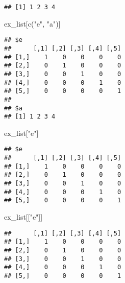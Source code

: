 \documentclass[
]{article}
\newenvironment{Shaded}{\begin{snugshade}}{\end{snugshade}}
\newcommand{\FunctionTok}[1]{\textcolor[rgb]{0.00,0.00,0.00}{#1}}
\newcommand{\NormalTok}[1]{#1}
\newcommand{\SpecialCharTok}[1]{\textcolor[rgb]{0.00,0.00,0.00}{#1}}
\newcommand{\StringTok}[1]{\textcolor[rgb]{0.31,0.60,0.02}{#1}}
\begin{document}
\begin{verbatim}
## [1] 1 2 3 4
\end{verbatim}

\begin{Shaded}
\begin{Highlighting}[]
\NormalTok{ex\_list[}\FunctionTok{c}\NormalTok{(}\StringTok{"e"}\NormalTok{, }\StringTok{"a"}\NormalTok{)]}
\end{Highlighting}
\end{Shaded}

\begin{verbatim}
## $e
##      [,1] [,2] [,3] [,4] [,5]
## [1,]    1    0    0    0    0
## [2,]    0    1    0    0    0
## [3,]    0    0    1    0    0
## [4,]    0    0    0    1    0
## [5,]    0    0    0    0    1
## 
## $a
## [1] 1 2 3 4
\end{verbatim}

\begin{Shaded}
\begin{Highlighting}[]
\NormalTok{ex\_list[}\StringTok{"e"}\NormalTok{]}
\end{Highlighting}
\end{Shaded}

\begin{verbatim}
## $e
##      [,1] [,2] [,3] [,4] [,5]
## [1,]    1    0    0    0    0
## [2,]    0    1    0    0    0
## [3,]    0    0    1    0    0
## [4,]    0    0    0    1    0
## [5,]    0    0    0    0    1
\end{verbatim}

\begin{Shaded}
\begin{Highlighting}[]
\NormalTok{ex\_list[[}\StringTok{"e"}\NormalTok{]]}
\end{Highlighting}
\end{Shaded}

\begin{verbatim}
##      [,1] [,2] [,3] [,4] [,5]
## [1,]    1    0    0    0    0
## [2,]    0    1    0    0    0
## [3,]    0    0    1    0    0
## [4,]    0    0    0    1    0
## [5,]    0    0    0    0    1
\end{verbatim}

\begin{Shaded}
\end{Shaded}
\end{document}
